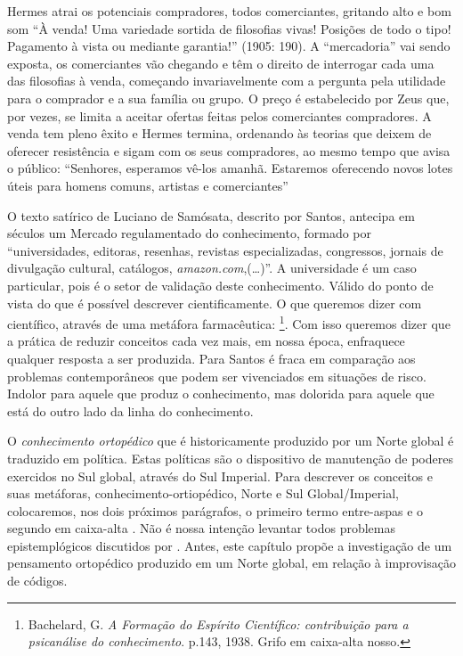 \begin{citacao}
Hermes atrai os potenciais compradores, todos comerciantes, gritando alto e bom som “À venda! Uma variedade sortida de filosofias vivas! Posições de todo o tipo! Pagamento à vista ou mediante garantia!” (1905: 190). A “mercadoria” vai sendo exposta, os comerciantes vão chegando e têm o direito de interrogar cada uma das filosofias à venda, começando invariavelmente com a pergunta pela utilidade para o comprador e a sua família ou grupo. O preço é estabelecido por Zeus que, por vezes, se limita a aceitar ofertas feitas pelos comerciantes compradores. A venda tem pleno êxito e Hermes termina, ordenando às teorias que deixem de oferecer resistência e sigam com os seus compradores, ao mesmo tempo que avisa o público: “Senhores, esperamos vê-los amanhã. Estaremos oferecendo novos lotes úteis para homens comuns, artistas e comerciantes”   
\end{citacao}

O texto satírico de Luciano de Samósata, descrito por Santos, antecipa em séculos um Mercado regulamentado do conhecimento, formado por ``universidades, editoras, resenhas, revistas especializadas, congressos, jornais de divulgação cultural, catálogos, \emph{amazon.com},(\ldots)''\cite[p.~12--13]{santos_filosofia_2008}. A universidade é um caso particular, pois é o setor de validação deste conhecimento.  Válido do ponto de vista do que é possível descrever cientificamente. O que queremos dizer com científico, através de uma metáfora farmacêutica: \footnote{Bachelard, G. \emph{A Formação do Espírito Científico: contribuição para a psicanálise do conhecimento}. p.143, 1938. Grifo em caixa-alta nosso.}. Com isso queremos dizer que a prática de reduzir conceitos cada vez mais, em nossa época, enfraquece qualquer resposta a ser produzida. Para Santos é fraca em comparação aos problemas contemporâneos que podem ser vivenciados em situações de risco. Indolor para aquele que produz o conhecimento, mas dolorida para aquele que está do outro lado da linha do conhecimento.

O \emph{conhecimento ortopédico} que é historicamente produzido por um Norte global é traduzido em política. Estas políticas são o dispositivo de manutenção de poderes exercidos no Sul global, através do Sul Imperial. Para descrever os conceitos e suas metáforas, conhecimento-ortiopédico, Norte e Sul Global/Imperial, colocaremos, nos dois próximos parágrafos, o primeiro termo entre-aspas e o segundo em caixa-alta \cite[p.~32]{McLean2011}. Não é nossa intenção levantar todos problemas epistemplógicos discutidos por . Antes, este capítulo propõe a investigação de um pensamento ortopédico produzido em um Norte global, em relação à improvisação de códigos.

